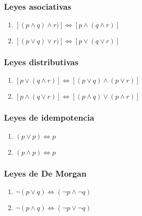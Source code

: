     \subsubsection{Leyes asociativas}
     \renewcommand{\labelenumi}{\alph{enumi})}
      \begin{enumerate}
      \item $[(p \wedge q) \wedge r)] \Leftrightarrow [p \wedge (q \wedge r)]$

      \item $[(p \vee q) \vee r)] \Leftrightarrow [p \vee (q \vee r)]$
      \end{enumerate}
      
      
    \subsubsection{Leyes distributivas}

      \renewcommand{\labelenumi}{\alph{enumi})}
	\begin{enumerate}

      \item $[p \vee (q \wedge r)] \Leftrightarrow [(p \vee q) \wedge (p \vee r)]$

      \item $[p \wedge (q \vee r)] \Leftrightarrow [(p \wedge q) \vee (p \wedge r)]$
      \end{enumerate}
      

    \subsubsection{Leyes de idempotencia}
      \renewcommand{\labelenumi}{\alph{enumi})}
      \begin{enumerate}
	\item $(p \vee p) \Leftrightarrow p$

	\item $(p \wedge p) \Leftrightarrow p$
      \end{enumerate}
      


    \subsubsection{Leyes  de De Morgan}
      \renewcommand{\labelenumi}{\alph{enumi})}
	\begin{enumerate}

      \item $\neg (p \vee q) \Leftrightarrow (\neg p \wedge \neg q)$

      \item $\neg (p \wedge q) \Leftrightarrow (\neg p \vee \neg q)$

	\end{enumerate}
	
